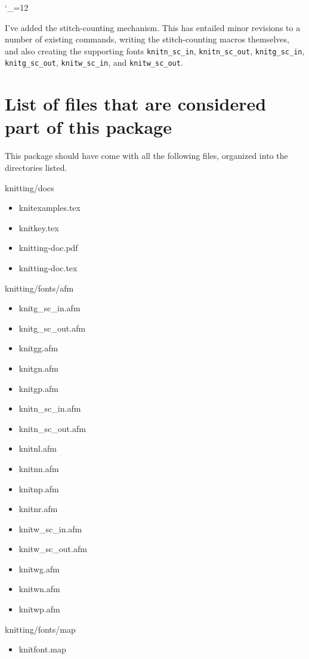 \documentclass[draft]{amsart}
\begin{document}
\catcode`\_=12

I've added the stitch-counting mechanism. This has entailed minor revisions to a number of existing commands, writing the stitch-counting macros themselves, and also creating the supporting fonts \texttt{knitn_sc_in}, \texttt{knitn_sc_out}, \texttt{knitg_sc_in}, \texttt{knitg_sc_out}, \texttt{knitw_sc_in}, and \texttt{knitw_sc_out}.

\section{List of files that are considered part of this package}
\label{se:manifest}

This package should have come with all the following files, organized into the directories listed.

\medskip

\begingroup \ttfamily
\noindent knitting/docs
\begin{itemize}
    \item knitexamples.tex
    \item knitkey.tex
    \item knitting-doc.pdf
    \item knitting-doc.tex
\end{itemize}

\noindent knitting/fonts/afm
\begin{itemize}
    \item knitg_sc_in.afm
    \item knitg_sc_out.afm
    \item knitgg.afm
    \item knitgn.afm
    \item knitgp.afm
    \item knitn_sc_in.afm
    \item knitn_sc_out.afm
    \item knitnl.afm
    \item knitnn.afm
    \item knitnp.afm
    \item knitnr.afm
    \item knitw_sc_in.afm
    \item knitw_sc_out.afm
    \item knitwg.afm
    \item knitwn.afm
    \item knitwp.afm
\end{itemize}

\noindent knitting/fonts/map
\begin{itemize}
    \item knitfont.map
\end{itemize}
\end{document}
